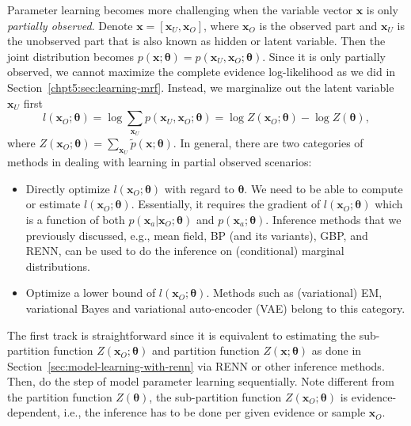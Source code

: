 Parameter learning becomes more challenging when the variable vector $\bm{x}$ is only \textit{partially observed}. Denote $\bm{x} = [\bm{x}_U, \bm{x}_O]$, where $\bm{x}_O$ is the observed part and $\bm{x}_U$ is the unobserved part that is also known as hidden or latent variable. Then the joint distribution becomes $p(\bm{x}; \bm{\theta}) = p(\bm{x}_U, \bm{x}_O; \bm{\theta})$. Since it is only partially observed, we cannot maximize the complete evidence log-likelihood as we did in Section~\ref{chpt5:sec:learning-mrf}. Instead, we marginalize out the latent variable $\bm{x}_U$ first
\begin{equation}\label{chpt5:eq:patial-likelihood}
  l(\bm{x}_O; \bm{\theta}) = \log{\sum_{\bm{x}_U}p(\bm{x}_U, \bm{x}_O; \bm{\theta})} = \log{Z(\bm{x}_O;\bm{\theta})} - \log{Z(\bm{\theta})},
\end{equation}
where $Z(\bm{x}_O;\bm{\theta}) = \sum_{\bm{x}_U}\tilde{p}(\bm{x}; \bm{\theta})$. In general, there are two categories of methods in dealing with learning in partial observed scenarios:
\begin{itemize}
\item Directly optimize $l(\bm{x}_O; \bm{\theta})$ with regard to $\bm{\theta}$. We need to be able to compute or estimate $l(\bm{x}_O; \bm{\theta})$. Essentially, it requires the gradient of $l(\bm{x}_O; \bm{\theta})$ which is a function of both $p(\bm{x}_a| \bm{x}_O; \bm{\theta})$ and $p(\bm{x}_a; \bm{\theta})$. Inference methods that we previously discussed, e.g., mean field, BP (and its variants), GBP, and RENN, can be used to do the inference on (conditional) marginal distributions.
\item Optimize a lower bound of $l(\bm{x}_O; \bm{\theta})$. Methods such as (variational) EM, variational Bayes and variational auto-encoder (VAE) \cite{kingma2019vae} belong to this category.
\end{itemize}

The first track is straightforward since it is equivalent to estimating the sub-partition function $Z(\bm{x}_O; \bm{\theta})$ and partition function $Z(\bm{x}; \bm{\theta})$ as done in Section~\ref{sec:model-learning-with-renn} via RENN or other inference methods. Then, do the step of model parameter learning sequentially. Note different from the partition function $Z(\bm{\theta})$, the sub-partition function $Z(\bm{x}_O; \bm{\theta})$ is evidence-dependent, i.e., the inference has to be done per given evidence or sample  $\bm{x}_O$. 

